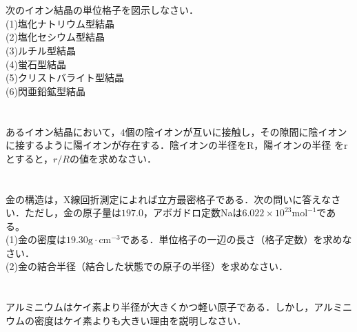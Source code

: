 \documentclass[dvipdfmx]{article}
\begin{document}
  \section{} 
    \begin{tcolorbox}[title=問題]
      次のイオン結晶の単位格子を図示しなさい．\\
      (1)塩化ナトリウム型結晶\\
      (2)塩化セシウム型結晶\\
      (3)ルチル型結晶\\
      (4)蛍石型結晶\\
      (5)クリストバライト型結晶\\
      (6)閃亜鉛鉱型結晶
    \end{tcolorbox}

    \begin{tcolorbox}[title=解答]
    \end{tcolorbox}


  \section{}
    \begin{tcolorbox}[title=問題]
      あるイオン結晶において，$4$個の陰イオンが互いに接触し，その隙間に陰イオンに接するように陽イオンが存在する．陰イオンの半径をR，陽イオンの半径
      をrとすると，$r/R$の値を求めなさい．
    \end{tcolorbox}
    \begin{tcolorbox}[title=解答]
    \end{tcolorbox}
  \section{}
    \begin{tcolorbox}[title=問題]
      金の構造は，X線回折測定によれば立方最密格子である．次の問いに答えなさい．ただし，金の原子量は$197.0$，アボガドロ定数Naは$\mathrm{6.022 \times 10^{23}mol^{-1}} $である。\\
      (1)金の密度は$\mathrm {19.30 g \cdot cm^{-3} }$である．単位格子の一辺の長さ（格子定数）を求めなさい．\\
      (2)金の結合半径（結合した状態での原子の半径）を求めなさい．
    \end{tcolorbox}
    \begin{tcolorbox}[title=解答]
    \end{tcolorbox}

    
  \section{}
    \begin{tcolorbox}[title=問題]
      アルミニウムはケイ素より半径が大きくかつ軽い原子である．しかし，アルミニウムの密度はケイ素よりも大きい理由を説明しなさい．
    \end{tcolorbox}
\end{document}
